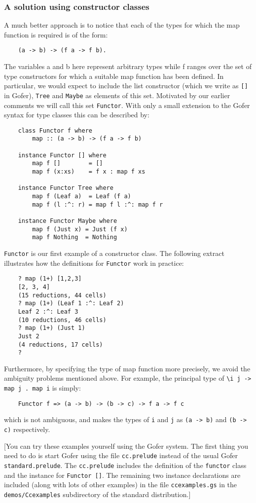\subsubsection{A solution using constructor classes}
A much better approach is to notice that each of the types for which
the map function is required is of the form:
\begin{verbatim}
    (a -> b) -> (f a -> f b).
\end{verbatim}
The variables a and b here represent arbitrary types while f ranges
over the set of type constructors for which a suitable map function has
been defined.  In particular, we would expect to include the list
constructor (which we write as \verb"[]" in Gofer), \verb"Tree" and \verb"Maybe" as elements
of this set.  Motivated by our earlier comments we will call this set
\verb"Functor".  With only a small extension to the Gofer syntax for type
classes this can be described by:
\begin{verbatim}
    class Functor f where
        map :: (a -> b) -> (f a -> f b)

    instance Functor [] where
        map f []        = []
        map f (x:xs)    = f x : map f xs

    instance Functor Tree where
        map f (Leaf a)  = Leaf (f a)
        map f (l :^: r) = map f l :^: map f r

    instance Functor Maybe where
        map f (Just x) = Just (f x)
        map f Nothing  = Nothing
\end{verbatim}
\verb"Functor" is our first example of a constructor class.  The following
extract illustrates how the definitions for \verb"Functor" work in practice:
\begin{verbatim}
    ? map (1+) [1,2,3]
    [2, 3, 4]
    (15 reductions, 44 cells)
    ? map (1+) (Leaf 1 :^: Leaf 2)
    Leaf 2 :^: Leaf 3
    (10 reductions, 46 cells)
    ? map (1+) (Just 1)
    Just 2
    (4 reductions, 17 cells)
    ?
\end{verbatim}
Furthermore, by specifying the type of map function more precisely,
we avoid the ambiguity problems mentioned above.  For example, the
principal type of \verb"\i j -> map j . map i" is simply:
\begin{verbatim}
    Functor f => (a -> b) -> (b -> c) -> f a -> f c
\end{verbatim}
which is not ambiguous, and makes the types of \verb"i" and \verb"j" as \verb"(a -> b)"
and \verb"(b -> c)" respectively.

[You can try these examples yourself using the Gofer system.  The first
thing you need to do is start Gofer using the file \verb"cc.prelude" instead
of the usual Gofer \verb"standard.prelude".  The \verb"cc.prelude" includes the
definition of the \verb"functor" class and the instance for \verb"Functor []".  The
remaining two instance declarations are included (along with lots of
other examples) in the file \verb"ccexamples.gs" in the \verb"demos/Ccexamples"
subdirectory of the standard distribution.]


